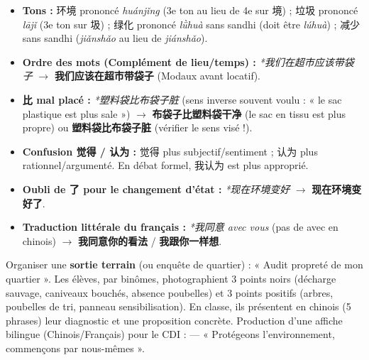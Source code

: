 \documentclass[11pt]{article}
\newcommand{\cle}[1]{{\popxbold\color{popdark}#1}}
\newcommand{\zh}[1]{\ifmmode\text{#1}\else{#1}\fi}
\begin{document}
\begin{attention}
\begin{itemize}
    \item \textbf{Tons :} \cle{环境} prononcé \textit{huánjǐng} (3e ton au lieu de 4e sur \cle{境}) ; \cle{垃圾} prononcé \textit{lājǐ} (3e ton sur \cle{圾}) ; \cle{绿化} prononcé \textit{lǜhuà} sans sandhi (doit être \textit{lúhuà}) ; \cle{减少} sans sandhi (\textit{jiǎnshǎo} au lieu de \textit{jiánshǎo}).
    \item \textbf{Ordre des mots (Complément de lieu/temps) :} \textit{*我们在超市应该带袋子} $\rightarrow$ \textbf{我们应该在超市带袋子} (Modaux avant locatif).
    \item \textbf{\cle{比} mal placé :} \textit{*塑料袋比布袋子脏} (sens inverse souvent voulu : « le sac plastique est plus sale ») $\rightarrow$ \textbf{布袋子比塑料袋干净} (le sac en tissu est plus propre) ou \textbf{塑料袋比布袋子脏} (vérifier le sens visé !).
    \item \textbf{Confusion \cle{觉得} / \cle{认为} :} \cle{觉得} plus subjectif/sentiment ; \cle{认为} plus rationnel/argumenté. En débat formel, \cle{我认为} est plus approprié.
    \item \textbf{Oubli de \cle{了} pour le changement d'état :} \textit{*现在环境变好} $\rightarrow$ \textbf{现在环境变好\cle{了}}.
    \item \textbf{Traduction littérale du français :} \textit{*我同意 avec vous} (pas de \cle{avec} en chinois) $\rightarrow$ \textbf{我同意你的看法} / \textbf{我跟你一样想}.
\end{itemize}
\end{attention}

\begin{experience}
Organiser une \textbf{sortie terrain} (ou enquête de quartier) : « Audit propreté de mon quartier ». Les élèves, par binômes, photographient 3 points noirs (décharge sauvage, caniveaux bouchés, absence poubelles) et 3 points positifs (arbres, poubelles de tri, panneau sensibilisation). En classe, ils présentent en chinois (5 phrases) leur diagnostic et une proposition concrète. Production d'une affiche bilingue (Chinois/Français) pour le CDI : \zh{保护环境，从我做起} — « Protégeons l'environnement, commençons par nous-mêmes ».
\end{experience}

\newpage
\end{document}
